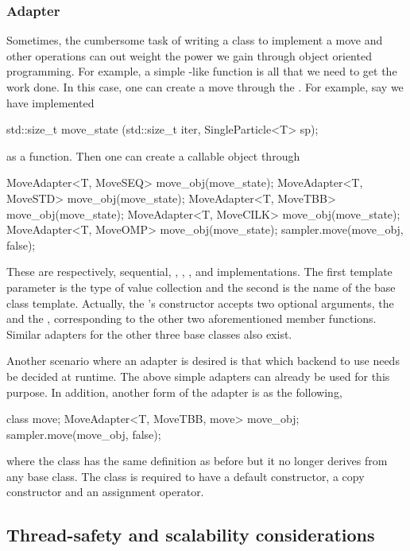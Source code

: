 \subsubsection{Adapter}
\label{ssub:Adapter}

Sometimes, the cumbersome task of writing a class to implement a move and
other operations can out weight the power we gain through object oriented
programming. For example, a simple -like function is all that
we need to get the work done. In this case, one can create a move through the
. For example, say we have implemented
\begin{cppcode}
std::size_t move_state (std::size_t iter, SingleParticle<T> sp);
\end{cppcode}
as a function. Then one can create a callable object through
\begin{cppcode}
MoveAdapter<T, MoveSEQ>  move_obj(move_state);
MoveAdapter<T, MoveSTD>  move_obj(move_state);
MoveAdapter<T, MoveTBB>  move_obj(move_state);
MoveAdapter<T, MoveCILK> move_obj(move_state);
MoveAdapter<T, MoveOMP>  move_obj(move_state);
sampler.move(move_obj, false);
\end{cppcode}
These are respectively, sequential, \cppoo{} , \tbb, \cilk,
and \openmp implementations. The first template parameter is the type of value
collection and the second is the name of the base class template. Actually,
the 's constructor accepts two optional arguments, the
 and the , corresponding to the other
two aforementioned member functions. Similar adapters for the other three base
classes also exist.

Another scenario where an adapter is desired is that which backend to use
needs be decided at runtime. The above simple adapters can already be used for
this purpose. In addition, another form of the adapter is as the following,
\begin{cppcode}
class move;
MoveAdapter<T, MoveTBB, move> move_obj;
sampler.move(move_obj, false);
\end{cppcode}
where the class  has the same definition as before but it no longer
derives from any base class. The class  is required to have a
default constructor, a copy constructor and an assignment operator.

\subsection{Thread-safety and scalability considerations}
\label{sub:Thread-safety and scalability considerations}

